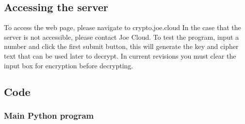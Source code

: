 \documentclass[a4paper]{article}
\begin{document}
\subsection{Accessing the server} 
To access the web page, please navigate to crypto.joe.cloud
In the case that the server is not accessible, please contact Joe Cloud.
To test the program, input a number and click the first submit button, this will generate the key and cipher text that can be used later to decrypt. In current revisions you must clear the input box for encryption before decrypting.

\newpage
\subsection{Code}
\subsubsection{Main Python program}
\end{document}
